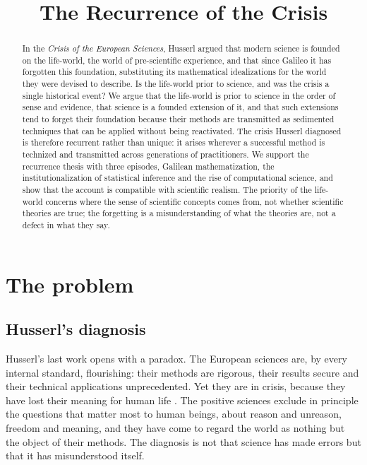 \documentclass{situationist-preprint}
\title{The Recurrence of the Crisis}
\begin{document}
\maketitle

\begin{abstract}
In the \emph{Crisis of the European Sciences}, Husserl argued that modern science is founded on the life-world, the world of pre-scientific experience, and that since Galileo it has forgotten this foundation, substituting its mathematical idealizations for the world they were devised to describe. Is the life-world prior to science, and was the crisis a single historical event? We argue that the life-world is prior to science in the order of sense and evidence, that science is a founded extension of it, and that such extensions tend to forget their foundation because their methods are transmitted as sedimented techniques that can be applied without being reactivated. The crisis Husserl diagnosed is therefore recurrent rather than unique: it arises wherever a successful method is technized and transmitted across generations of practitioners. We support the recurrence thesis with three episodes, Galilean mathematization, the institutionalization of statistical inference and the rise of computational science, and show that the account is compatible with scientific realism. The priority of the life-world concerns where the sense of scientific concepts comes from, not whether scientific theories are true; the forgetting is a misunderstanding of what the theories are, not a defect in what they say.
\end{abstract}

\section{The problem}

\subsection{Husserl's diagnosis}

Husserl's last work opens with a paradox. The European sciences are, by every internal standard, flourishing: their methods are rigorous, their results secure and their technical applications unprecedented. Yet they are in crisis, because they have lost their meaning for human life \citep[§§1--7]{Husserl1954}. The positive sciences exclude in principle the questions that matter most to human beings, about reason and unreason, freedom and meaning, and they have come to regard the world as nothing but the object of their methods. The diagnosis is not that science has made errors but that it has misunderstood itself.
\end{document}
